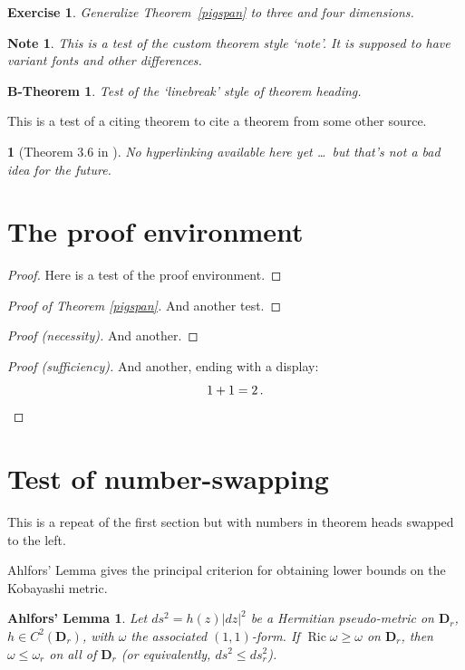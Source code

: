 \documentclass{article}
\theoremstyle{remark}
\theoremstyle{plain}
\newtheorem*{Ahlfors}{Ahlfors' Lemma}
\theoremstyle{note}
\newtheorem{note}{Note}
\theoremstyle{citing}
\newtheorem*{varthm}{}%
\theoremstyle{break}
\newtheorem{bthm}{B-Theorem}
\theoremstyle{exercise}
\newtheorem{exer}{Exercise}
\theoremstyle{plain}
\let\lvert=|\let\rvert=|
\newcommand{\Ric}{\mathop{\mathrm{Ric}}\nolimits}
\begin{document}
\begin{exer}
Generalize Theorem~\ref{pigspan} to three and four dimensions.
\end{exer}

\begin{note}
This is a test of the custom theorem style `note'. It is supposed to have
variant fonts and other differences.
\end{note}

\begin{bthm}
Test of the `linebreak' style of theorem heading.
\end{bthm}

This is a test of a citing theorem to cite a theorem from some other source.

\begin{varthm}[Theorem 3.6 in \cite{thatone}]
No hyperlinking available here yet \dots\ but that's not a
bad idea for the future.
\end{varthm}

\section{The proof environment}

\begin{proof}
Here is a test of the proof environment.
\end{proof}

\begin{proof}[Proof of Theorem \ref{pigspan}]
And another test.
\end{proof}

\begin{proof}[Proof \textup(necessity\textup)]
And another.
\end{proof}

\begin{proof}[Proof \textup(sufficiency\textup)]
And another, ending with a display:
\[
1+1=2\,. \qedhere
\]
\end{proof}

\section{Test of number-swapping}

This is a repeat of the first section but with numbers in theorem heads
swapped to the left.

Ahlfors' Lemma gives the principal criterion for obtaining lower bounds
on the Kobayashi metric.
\begin{Ahlfors}
Let $ds^2 = h(z)\lvert dz\rvert^2$ be a Hermitian pseudo-metric on
$\mathbf{D}_r$, $h\in C^2(\mathbf{D}_r)$, with $\omega$ the associated
$(1,1)$-form. If $\Ric\omega\geq\omega$ on $\mathbf{D}_r$,
then $\omega\leq\omega_r$ on all of $\mathbf{D}_r$ (or equivalently,
$ds^2\leq ds_r^2$).
\end{Ahlfors}
\end{document}
